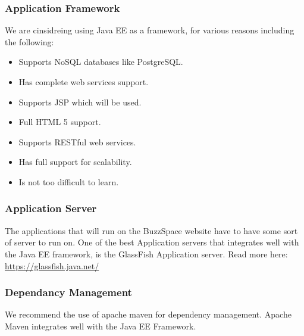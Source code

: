 \subsubsection{Application Framework}

We are cinsidreing using Java EE as a framework, for various reasons including the following: 

\begin{itemize}
\item	Supports NoSQL databases like PostgreSQL.
\item	Has complete web services support. 
\item	Supports JSP which will be used. 
\item	Full HTML 5 support. 
\item  Supports RESTful web services. 
\item  Has full support for scalability. 
\item Is not too difficult to learn. 
\end{itemize}


\subsubsection{Application Server}

The applications that will run on the BuzzSpace website have to have some sort of server to run on. One of the best Application servers that integrates well with the Java EE framework, is the GlassFish Application server. Read more here: \url{https://glassfish.java.net/}

\subsubsection{Dependancy Management}

We recommend the use of apache maven for dependency management. Apache Maven integrates well with the Java EE Framework. 

